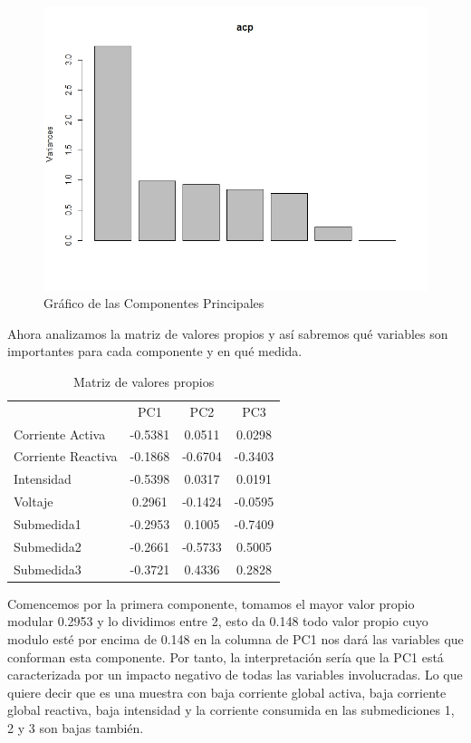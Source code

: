\documentclass[a4paper,10pt,twocolumn]{report}
\begin{document}
	\begin{figure}[H]
		\includegraphics[width=0.9\linewidth]{img/acp/acp.jpeg}
		\caption{Gráfico de las Componentes Principales}
		\label{fig:1}
	\end{figure}
	
	Ahora analizamos la matriz de valores propios y así sabremos qué variables son importantes para cada componente y en qué medida.
	
	\begin{table}[ht]
	\begin{tabular}{lccc}
		                   &   PC1   &   PC2   &   PC3   \\
		Corriente Activa   & -0.5381 & 0.0511  & 0.0298  \\
		Corriente Reactiva & -0.1868 & -0.6704 & -0.3403 \\
		Intensidad         & -0.5398 & 0.0317  & 0.0191  \\
		Voltaje            & 0.2961  & -0.1424 & -0.0595 \\
		Submedida1         & -0.2953 & 0.1005  & -0.7409 \\
		Submedida2         & -0.2661 & -0.5733 & 0.5005  \\
		Submedida3         & -0.3721 & 0.4336  & 0.2828
	\end{tabular}
	\label{tab:3}
	\caption{Matriz de valores propios}
	\end{table}
	
	Comencemos por la primera componente, tomamos el mayor valor propio modular 0.2953 y lo dividimos entre 2, esto da 0.148 todo valor propio cuyo modulo esté por encima de 0.148 en la columna de PC1 nos dará las variables que conforman esta componente. Por tanto, la interpretación sería que la PC1 está caracterizada por un impacto negativo de todas las variables involucradas. Lo que quiere decir que es una muestra con baja corriente global activa, baja corriente global reactiva, baja intensidad y la corriente consumida en las submediciones 1, 2 y 3 son bajas también.
	
\end{document}
